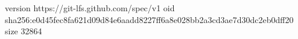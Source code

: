 version https://git-lfs.github.com/spec/v1
oid sha256:e0d45fec8fa621d09d84e6aadd8227ff6a8e028bb2a3cd3ae7d30dc2eb0dff20
size 32864
